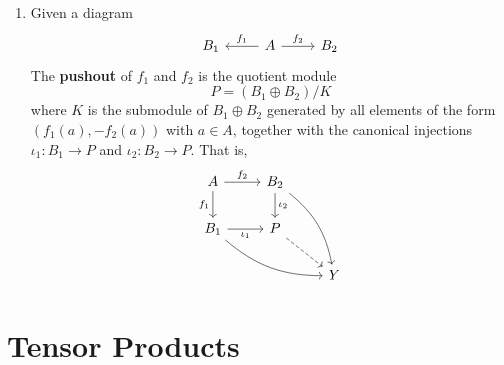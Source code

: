 \begin{definition}
\begin{enumerate}
        \item
              Given a diagram
              \begin{equation*}
                  \begin{tikzcd}
                      B_1 &\arrow[l,"f_1"'] A\arrow[r,"f_2"]& B_2
                  \end{tikzcd}
              \end{equation*}
              The \textbf{pushout} of $f_1$ and $f_2$ is the quotient module
              \begin{equation*}
                  P=(B_1 \oplus B_2) / K
              \end{equation*}
              where $K$ is the submodule of $B_1 \oplus B_2$ generated by all elements of the form $(f_1(a),-f_2(a))$ with $a \in A$, together with the canonical injections $\iota_1: B_1 \rightarrow P$ and $\iota_2: B_2 \rightarrow P$.
              That is,
              \begin{equation*}
                  \begin{tikzcd}
                      A \arrow[r,"f_2"] \arrow[d,"f_1"'] & B_2\arrow[ddr,bend left=20,""] \arrow[d,"\iota_2"]& \\
                      B_1 \arrow[rrd,bend right=20,""]\arrow[r,"\iota_1"'] & P \arrow[rd,dashed,""]&\\
                      && Y
                  \end{tikzcd}
              \end{equation*}
    \end{enumerate}
\end{definition}













\section{Tensor Products} %
